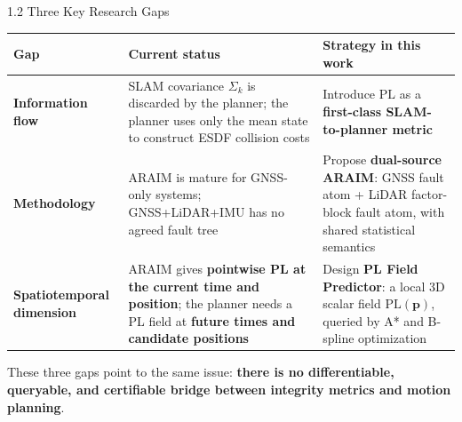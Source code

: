 \documentclass[10pt,aspectratio=169,xcolor=dvipsnames]{beamer}
\newcommand{\PL}{\mathrm{PL}}
\newcommand{\1}{\mathbb{1}}
\newcommand{\innov}[1]{\textcolor{NavyBlue}{\textbf{#1}}}
\begin{document}
\begin{frame}{1.2 Three Key Research Gaps}
  \begin{table}
    \small
    \begin{tabular}{p{} p{} p{}}
      \toprule
      \textbf{Gap} & \textbf{Current status} & \textbf{Strategy in this work}\\
      \midrule
      \textbf{Information flow} & SLAM covariance \(\Sigma_k\) is discarded by the planner;
      the planner uses only the mean state to construct ESDF collision costs &
      Introduce \(\PL\) as a \innov{first-class SLAM-to-planner metric}\\
      \addlinespace
      \textbf{Methodology} & ARAIM is mature for GNSS-only systems;
      GNSS+LiDAR+IMU has no agreed fault tree &
      Propose \innov{dual-source ARAIM}: GNSS fault atom + LiDAR factor-block fault atom, with shared statistical semantics\\
      \addlinespace
      \textbf{Spatiotemporal dimension} & ARAIM gives \textbf{pointwise PL at the current time and position};
      the planner needs a PL field at \textbf{future times and candidate positions} &
      Design \innov{PL Field Predictor}: a local 3D scalar field \(\PL(\bm{p})\), queried by A* and B-spline optimization\\
      \bottomrule
    \end{tabular}
  \end{table}

  \vspace{6pt}
  \footnotesize These three gaps point to the same issue: \textbf{there is no differentiable, queryable, and certifiable bridge between integrity metrics and motion planning}.
\end{frame}
\end{document}
